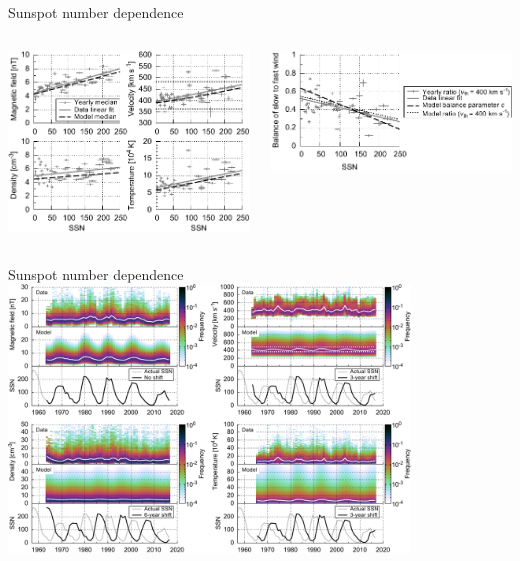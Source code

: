 \begin{frame}[c]{Sunspot number dependence}{}
	\begin{columns}[c]
		
		\includegraphics[width=\textwidth]{../figures_paper/OMNI_yearly_BVNTvsSSN_a.pdf}


		\includegraphics[width=\textwidth]{../figures_paper/Vdbl_SSN_ratio_f_plot.pdf}

	\end{columns}
\end{frame}
\begin{frame}[c]{Sunspot number dependence}{}
	\centering
	\includegraphics[width=0.8\textwidth]{../figures_paper/OMNI_yearly_BVdblNTSSN_fit_e_plot.pdf}
\end{frame}

